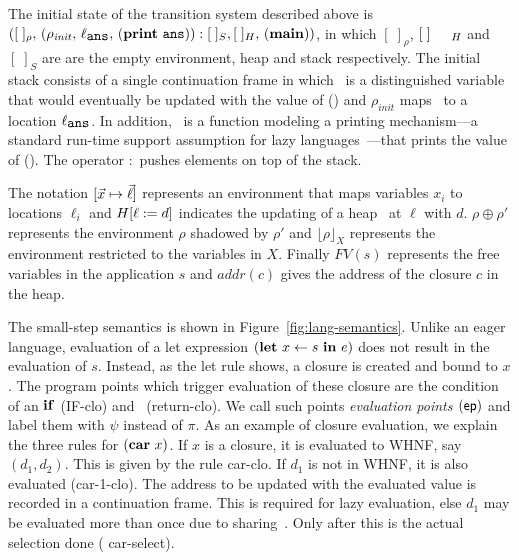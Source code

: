 \documentclass[preprint,9pt]{sigplanconf}
\def\myvec{\mathaccent"017E }
\begin{document}
The  initial  state  of  the  transition  system  described  above  is
$([\;]_\rho,\,   (\rho_\mathit{init},   \, \ell_{\mathbf{\mbox{\tt ans}}}  ,\,
(\mathbf{print}~\mathbf{\mbox{\tt ans}})):[\;]_{S}, 
[\;]_{H},\, (\mathbf{main}))$,  in which  $[\;]_\rho$,
$[\;]_{\mbox \footnotesize {H}}$
and $[\;]_{S}$ are    are the
empty environment, heap and stack respectively. The  initial stack consists
of  a single  continuation frame  in  which \ans\  is a  distinguished
variable  that  would   eventually  be  updated  with   the  value  of
(\mainpgm) and $\rho_\mathit{init}$ maps \ans\ to a location $\ell_{\mathbf{\mbox{\tt ans}}}$.   In  addition, \print\ is  a function modeling  a printing
mechanism---a   standard   run-time   support  assumption   for   lazy
languages~\cite{Jones87}---that prints  the value of  (\mainpgm).  The operator $:$
pushes elements on top of the stack.

The   notation  $[\myvec{x}   \mapsto  \myvec{\ell}]$   represents  an
environment  that  maps  variables  $x_i$ to  locations  $\ell_i$  and
$H[\ell := d]$  indicates the updating of a heap  \heap\ at $\ell$
with  $d$.   $\rho \oplus  \rho'$  represents  the environment  $\rho$
shadowed  by  $\rho'$  and  $\lfloor \rho  \rfloor_X$  represents  the
environment  restricted  to  the  variables in  $X$.  Finally  $FV(s)$
represents the  free variables  in the  application $s$  and $addr(c)$
gives the address of the closure $c$ in the heap.

The small-step semantics  is shown in Figure~\ref{fig:lang-semantics}.
Unlike   an   eager  language,   evaluation   of   a  let   expression
$(\mbox{$\mathbf{ let}$}~x\leftarrow  s~\mbox{$\mathbf{ in}$}~e)$ does  not  result in  the evaluation  of
$s$. Instead,  as the {\sc let}  rule shows, a closure  is created and
bound to  $x$. The  program points which  trigger evaluation  of these
closure   are  the   condition  of   an  $\mbox{$\mathbf{ if}$}$   ({\sc  IF-clo})   and
\SRETURN\ ({\sc  return-clo}).  We  call such  points \emph{evaluation
  points   $(\mathsf{ep})$}  and   label  them   with  $\psi$   instead  of
$\pi$. As an  example of closure  evaluation, we  explain the
three rules for  $(\mbox{$\mathbf{car}$}~x)$.  If $x$ is a closure,  it is evaluated to
WHNF, say $(d_1, d_2)$.  This is  given by the rule {\sc car-clo}.  If
$d_1$ is  not in WHNF,  it is  also evaluated ({\sc  car-1-clo}).  The
address  to be  updated  with the  evaluated value  is
recorded  in  a  continuation  frame.    This  is  required  for  lazy
evaluation, else $d_1$ may  be evaluated more than once
due to  sharing~\cite{Jones87}.  Only after this  is the actual selection  done ({\sc
  car-select}).
\end{document}
